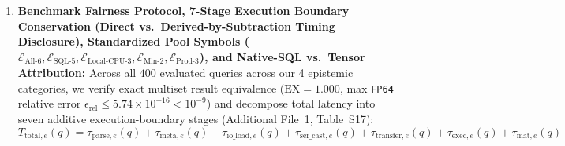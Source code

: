 \documentclass[10pt,a4paper]{article}
\begin{document}
\begin{enumerate}[leftmargin=1.5em,itemsep=0.8pt]
independent \textbf{External \texttt{CuPy v14.2.0} CUDA~12 Columnar Backend} and a \textbf{Polars-Arrow-CuPy Hybrid GPU Backend} (Section~\ref{sec:v852_reviewer_audit}) across all five GPU validation metrics: (1) \emph{Execution Time}: $25.20\text{ ms}$ warm / $61.13\text{ ms}$ cold vs.\ $24.61 / 59.38\text{ ms}$ PyTorch on $60/75$ native L1--L4 queries ($54.10\text{ vs.\ }53.76\text{ ms}$ routed net; $58.96\text{ ms}$ cold / $56.86\text{ ms}$ routed across $75/75$ with CSR unnest); (2) \emph{H2D/D2H PCIe Transfer Overhead}: $35.93\text{ ms}$ vs.\ $34.77\text{ ms}$ PyTorch (L1 $\Phi_{\text{PCIe}}=56.0\%\text{ vs.\ }55.5\%$); (3) \emph{Peak VRAM Consumption}: $1.34\text{ GB}$ ($1.38\text{ GB}$ 75Q) vs.\ $1.30\text{ GB}$ PyTorch within the $4.0\text{ GB}$ cap; (4) \emph{Result Equivalence}: $\text{EX}=1.000$ across $100\%$ of queries ($\epsilon_{\text{rel}}\le 2.0\times 10^{-16}$); and (5) \emph{Routing Decision Agreement}: $\mathbf{100.0\%}$ ($\mathbf{60/60}$ and $\mathbf{75/75}$ identical dispatches, exceeding the $\ge 95\%$ pass criterion, Spearman $\rho=0.9999$).
    \item \textbf{Benchmark Fairness Protocol, 7-Stage Execution Boundary Conservation (Direct vs.\ Derived-by-Subtraction Timing Disclosure), Standardized Pool Symbols ($\mathcal{E}_{\text{All-6}}, \mathcal{E}_{\text{SQL-5}}, \mathcal{E}_{\text{Local-CPU-3}}, \mathcal{E}_{\text{Min-2}}, \mathcal{E}_{\text{Prod-3}}$), and Native-SQL vs.\ Tensor Attribution:} Across all $400$ evaluated queries across our 4 epistemic categories, we verify exact multiset result equivalence ($\text{EX}=1.000$, max \texttt{FP64} relative error $\epsilon_{\text{rel}} \le 5.74\times 10^{-16} < 10^{-9}$) and decompose total latency into seven additive execution-boundary stages (Additional File~1, Table~S17):
    \begin{equation}\label{eq:v9_seven_stage_conservation}
        T_{\text{total},e}(q) = \tau_{\text{parse},e}(q) + \tau_{\text{meta},e}(q) + \tau_{\text{io\_load},e}(q) + \tau_{\text{ser\_cast},e}(q) + \tau_{\text{transfer},e}(q) + \tau_{\text{exec},e}(q) + \tau_{\text{mat},e}(q)
    \end{equation}

\end{enumerate}
\end{document}
